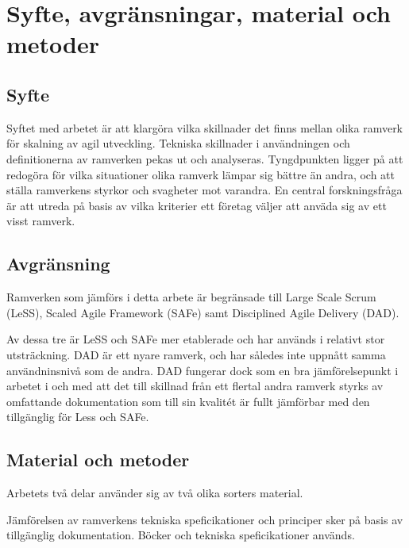 	
		
	\newpage
\section{Syfte, avgränsningar, material och metoder}
	
	
	\subsection{Syfte}
	
	Syftet med arbetet är att klargöra vilka skillnader det finns mellan olika ramverk för skalning av agil utveckling. Tekniska skillnader i användningen och definitionerna av ramverken pekas ut och analyseras.
	Tyngdpunkten ligger på att redogöra för vilka situationer olika ramverk lämpar sig bättre än andra, och att ställa ramverkens styrkor och svagheter mot varandra. \newline
	En central forskningsfråga är att utreda på basis av vilka kriterier ett företag väljer att anväda sig av ett visst ramverk.
	
	
	
	
	\subsection{Avgränsning}
	
	Ramverken som jämförs i detta arbete är begränsade till Large Scale Scrum (LeSS), Scaled Agile Framework (SAFe) samt Disciplined Agile Delivery (DAD).
	
	Av dessa tre är LeSS och SAFe mer etablerade och har används i relativt stor utsträckning. DAD är ett nyare ramverk, och har således inte uppnått samma användninsnivå som de andra. DAD fungerar dock som en bra jämförelsepunkt i arbetet i och med att det till skillnad från ett flertal andra ramverk styrks av omfattande dokumentation som till sin kvalitét är fullt jämförbar med den tillgänglig för Less och SAFe. \cite{ask_matrix}
	
	
	\subsection{Material och metoder}
	Arbetets två delar använder sig av två olika sorters material.
	
	Jämförelsen av ramverkens tekniska speficikationer och principer sker på basis av tillgänglig dokumentation. Böcker och tekniska speficikationer används.
	\linebreak
	
